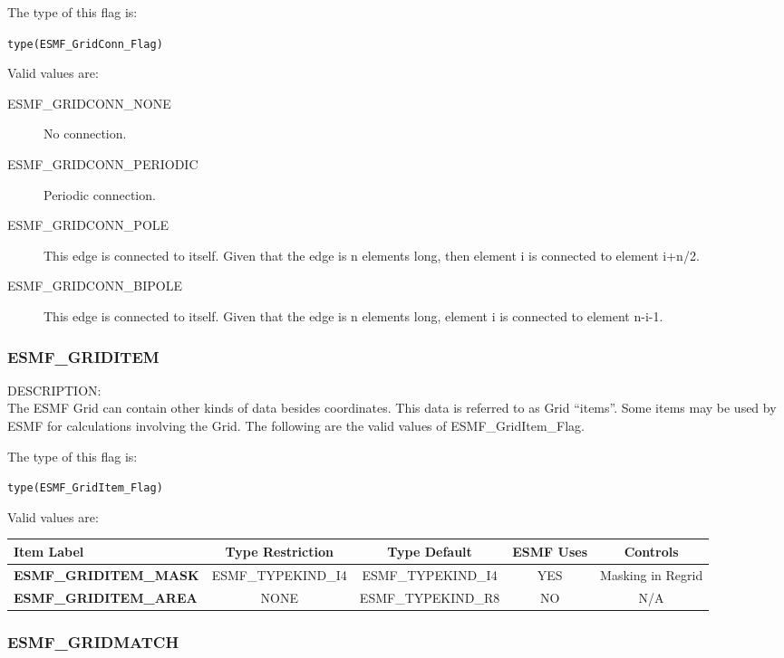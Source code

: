 The type of this flag is:

{\tt type(ESMF\_GridConn\_Flag)}

Valid values are:
\begin{description}
\item [ESMF\_GRIDCONN\_NONE] No connection.

\item [ESMF\_GRIDCONN\_PERIODIC] Periodic connection.

\item [ESMF\_GRIDCONN\_POLE] This edge is connected to itself. Given
that the edge is n elements long, then element i is connected to
element i+n/2.

\item [ESMF\_GRIDCONN\_BIPOLE] This edge is connected to itself. Given
that the edge is n elements long, element i is connected to element n-i-1.
\end{description}


\subsubsection{ESMF\_GRIDITEM}
\label{sec:opt:griditem}

{\sf DESCRIPTION:\\}
The ESMF Grid can contain other kinds of data besides coordinates. 
This data is referred to as Grid ``items''. Some items may be used
by ESMF for calculations involving the Grid. The following
are the valid values of ESMF\_GridItem\_Flag.

The type of this flag is:

{\tt type(ESMF\_GridItem\_Flag)}

Valid values are:
\begin{tabular}{|l|c|c|c|c||}
\hline
\hline
Item Label & {\bf Type Restriction}  & {\bf Type Default} & {\bf ESMF Uses} & {\bf Controls} \\
\hline
{\bf ESMF\_GRIDITEM\_MASK}  & ESMF\_TYPEKIND\_I4 & ESMF\_TYPEKIND\_I4 & YES & Masking in Regrid \\
{\bf ESMF\_GRIDITEM\_AREA} & NONE & ESMF\_TYPEKIND\_R8 & NO & N/A \\
\hline
\hline
\end{tabular}


\subsubsection{ESMF\_GRIDMATCH}
\label{sec:opt:gridmatchtype}

